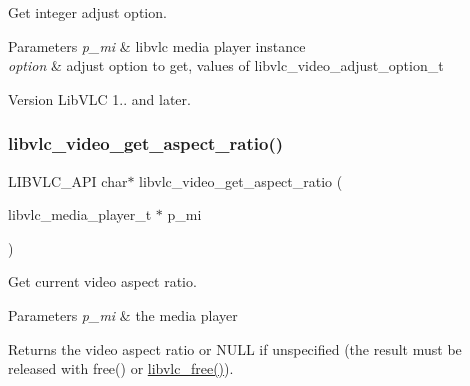 Get integer adjust option.


\begin{DoxyParams}{Parameters}
{\em p\+\_\+mi} & libvlc media player instance \\
\hline
{\em option} & adjust option to get, values of libvlc\+\_\+video\+\_\+adjust\+\_\+option\+\_\+t \\
\hline
\end{DoxyParams}
\begin{DoxyVersion}{Version}
Lib\+V\+LC 1.. and later. 
\end{DoxyVersion}
\mbox{\label{group__libvlc__video_ga058fe83cdecb2c66d075372416f233f8}} 
\subsubsection{\texorpdfstring{libvlc\+\_\+video\+\_\+get\+\_\+aspect\+\_\+ratio()}{libvlc\_video\_get\_aspect\_ratio()}}
{\footnotesize\ttfamily L\+I\+B\+V\+L\+C\+\_\+\+A\+PI char$\ast$ libvlc\+\_\+video\+\_\+get\+\_\+aspect\+\_\+ratio (\begin{DoxyParamCaption}\item[{libvlc\+\_\+media\+\_\+player\+\_\+t $\ast$}]{p\+\_\+mi }\end{DoxyParamCaption})}

Get current video aspect ratio.


\begin{DoxyParams}{Parameters}
{\em p\+\_\+mi} & the media player \\
\hline
\end{DoxyParams}
\begin{DoxyReturn}{Returns}
the video aspect ratio or N\+U\+LL if unspecified (the result must be released with free() or \hyperlink{group__libvlc__core_gab42b9c99de37cddea9b4e817cf14524f}{libvlc\+\_\+free()}). 
\end{DoxyReturn}
\mbox{\label{group__libvlc__video_ga152487c73035d2b9a69aa7b41764c029}} 
